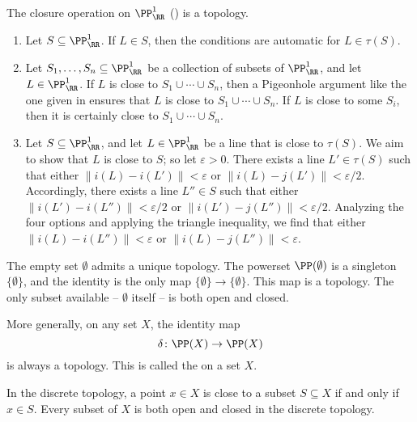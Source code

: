 \begin{exm}
	The closure operation on $\PP^1_{\RR}$ () is a topology.
	\begin{enumerate}
		\item Let $S \subseteq \PP^1_{\RR}$.
			If $L \in S$, then the conditions are automatic for $L \in \tau(S)$.
		\item Let $S_1, \dots, S_n \subseteq \PP^1_{\RR}$ be a collection of subsets of $\PP^1_{\RR}$, and let $L \in \PP^1_{\RR}$.
			If $L$ is close to $S_1 \cup \cdots \cup S_n$, then a Pigeonhole argument like the one given in  ensures that $L$ is close to $S_1 \cup \cdots \cup S_n$.%
			If $L$ is close to some $S_i$, then it is certainly close to $S_1 \cup \cdots \cup S_n$.
		\item Let $S \subseteq \PP^1_{\RR}$, and let $L \in \PP^1_{\RR}$ be a line that is close to $\tau(S)$.
			We aim to show that $L$ is close to $S$;
			so let $\varepsilon>0$.
			There exists a line $L' \in \tau(S)$ such that either $\|i(L) - i(L')\|<\varepsilon$ or $\|i(L)-j(L')\|<\varepsilon/2$.
			Accordingly, there exists a line $L'' \in S$ such that either $\|i(L') - i(L'')\| < \varepsilon/2$ or $\|i(L') - j(L'')\| < \varepsilon/2$.
			Analyzing the four options and applying the triangle inequality, we find that either $\|i(L) - i(L'')\|<\varepsilon$ or $\|i(L) - j(L'') \|<\varepsilon$.
	\end{enumerate}
\end{exm}

\begin{exm}
	The empty set $ \emptyset $ admits a unique topology.
	The powerset $ \PP( \emptyset ) $ is a singleton $ \{ \emptyset \} $, and the identity is the only map $ \{ \emptyset \} \to \{ \emptyset \} $.
	This map is a topology.
	The only subset available -- $ \emptyset $ itself -- is both open and closed.
\end{exm}

\begin{exm}
	More generally, on any set $ X $, the identity map
	\[
		\delta \colon \PP(X) \to \PP(X)
	\]
	is always a topology.
	This is called the  on a set $ X $.

	In the discrete topology, a point $ x \in X $ is close to a subset $ S \subseteq X $ if and only if $ x \in S $.
	Every subset of $ X $ is both open and closed in the discrete topology.
\end{exm}

